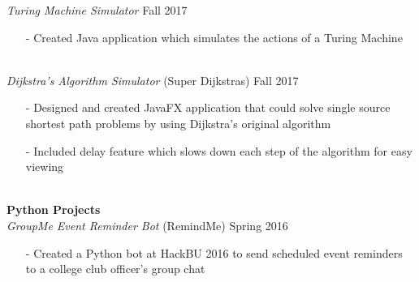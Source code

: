 \documentclass[10pt]{article}
\newcommand{\Indent}{\indent\indent}
\begin{document}
            \Indent \small\textit{Turing Machine Simulator} \hfill \small{Fall 2017}\indent\\
                \Indent\begin{minipage}{\dimexpr\textwidth-6cm}
                    \begin{itemize}[noitemsep, topsep=0pt]
                        \item[-] Created Java application which simulates the actions of a Turing Machine
                    \end{itemize}\vspace{0mm}
                \end{minipage}\\
            \Indent \small\textit{Dijkstra's Algorithm Simulator}\small{ (Super Dijkstras)} \hfill \small{Fall 2017}\indent\vspace{0.5mm}\\
                \Indent\begin{minipage}{\dimexpr\textwidth-6cm}
                    \begin{itemize}[noitemsep, topsep=0pt]
                        \item[-] Designed and created JavaFX application that could solve single source shortest path problems by using Dijkstra's original algorithm
                        \item[-] Included delay feature which slows down each step of the algorithm for easy viewing
                    \end{itemize}\vspace{0mm}
                \end{minipage}\\
        \indent \small\textbf{Python Projects}\\
            \Indent \small\textit{GroupMe Event Reminder Bot}\small{ (RemindMe)} \hfill \small{Spring 2016}\indent\vspace{0.5mm}\\
                \Indent\begin{minipage}{\dimexpr\textwidth-6cm}
                    \begin{itemize}[noitemsep, topsep=0pt]
                        \item[-] Created a Python bot at HackBU 2016 to send scheduled event reminders to a college club officer's group chat
                    \end{itemize}\vspace{0mm}
                \end{minipage}\\
\end{document}

